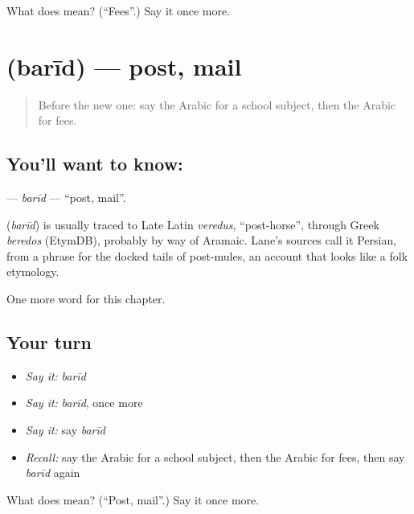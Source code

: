 \begin{tcolorbox}[breakable,colback=teal!4,colframe=teal!35!black,title={Before you move on}]
What does  mean? (\textquotedblleft{}Fees\textquotedblright{}.) Say it once more.
\end{tcolorbox}
\section[\texorpdfstring{\ar{بريد} (barīd)}{بريد (barīd)}]{ (barīd) — post, mail}

\label{lesson:AR-C252-barid}



\begin{quote}
Before the new one: say the Arabic for a school subject, then the Arabic for fees.
\end{quote}

\subsection*{You'll want to know: }
\textbf{} — \emph{barīd} — \textquotedblleft{}post, mail\textquotedblright{}.

\begin{cousinweb}
\textbf{} (\emph{barīd}) is usually traced to Late Latin \emph{veredus}, \textquotedblleft{}post-horse\textquotedblright{}, through Greek \emph{beredos} (EtymDB), probably by way of Aramaic. Lane's sources call it Persian, from a phrase for the docked tails of post-mules, an account that looks like a folk etymology.
\end{cousinweb}

\begin{grammarlens}[title={What you've built}]
One more word for this chapter.
\end{grammarlens}

\subsection*{Your turn}
\begin{itemize}
\raggedright
  \item \emph{Say it:} \emph{barīd}
  \item \emph{Say it:} \emph{barīd}, once more
  \item \emph{Say it:} say \emph{barīd}
  \item \emph{Recall:} say the Arabic for a school subject, then the Arabic for fees, then say \emph{barīd} again
\end{itemize}

\begin{tcolorbox}[breakable,colback=teal!4,colframe=teal!35!black,title={Before you move on}]
What does  mean? (\textquotedblleft{}Post, mail\textquotedblright{}.) Say it once more.
\end{tcolorbox}
